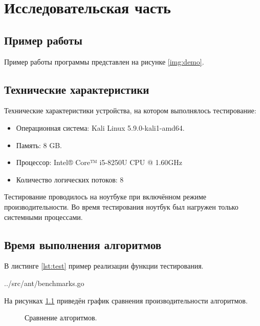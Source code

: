 \chapter{Исследовательская часть}

\section{Пример работы}

Пример работы программы представлен на рисунке \ref{img:demo}.


\section{Технические характеристики}

Технические характеристики устройства, на котором выполнялось тестирование:

\begin{itemize}
	\item Операционная система: Kali \cite{kali} Linux \cite{linux} 5.9.0-kali1-amd64.
	\item Память: 8 GB.
	\item Процессор: Intel® Core™ i5-8250U \cite{intel} CPU @ 1.60GHz
	\item Количество логических потоков: 8
\end{itemize}

Тестирование проводилось на ноутбуке при включённом режиме производительности. Во время тестирования ноутбук был нагружен только системными процессами.


\section{Время выполнения алгоритмов}

В листинге \ref{lst:test} пример реализации функции тестирования.

\begin{lstinputlisting}[
	caption={Функция тестирования},
	label={lst:test},
	style={go},
	linerange={31-59},
	]{../src/ant/benchmarks.go}
\end{lstinputlisting}

На рисунках \ref{plt:time} приведён график сравнения производительности алгоритмов.

\begin{figure}[!h]
	\centering
	\captionsetup{justification=centering}
	\caption{Сравнение алгоритмов.}
	\label{plt:time}
\end{figure}

